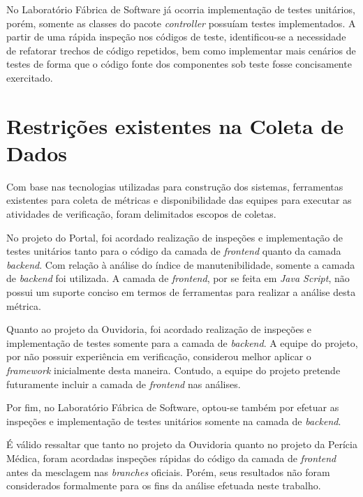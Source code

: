 No Laboratório Fábrica de Software já ocorria implementação de testes unitários, porém, somente as classes do pacote \textit{controller} possuíam testes implementados. A partir de uma rápida inspeção nos códigos de teste, identificou-se a necessidade de refatorar trechos de código repetidos, bem como implementar mais cenários de testes de forma que o código fonte dos componentes sob teste fosse concisamente exercitado.

\section{Restrições existentes na Coleta de Dados}

Com base nas tecnologias utilizadas para construção dos sistemas, ferramentas existentes para coleta de métricas e disponibilidade das equipes para executar as atividades de verificação, foram delimitados escopos de coletas.

No projeto do Portal, foi acordado realização de inspeções e implementação de testes unitários tanto para o código da camada de \textit{frontend} quanto da camada \textit{backend}. Com relação à análise do índice de manutenibilidade, somente a camada de \textit{backend} foi utilizada. A camada de \textit{frontend}, por se feita em \textit{Java Script}, não possui um suporte conciso em termos de ferramentas para realizar a análise desta métrica.

Quanto ao projeto da Ouvidoria, foi acordado realização de inspeções e implementação de testes somente para a camada de \textit{backend}. A equipe do projeto, por não possuir experiência em verificação, considerou melhor aplicar o \textit{framework} inicialmente desta maneira. Contudo, a equipe do projeto pretende futuramente incluir a camada de \textit{frontend} nas análises.

Por fim, no Laboratório Fábrica de Software, optou-se também por efetuar as inspeções e implementação de testes unitários somente na camada de \textit{backend}.

É válido ressaltar que tanto no projeto da Ouvidoria quanto no projeto da Perícia Médica, foram acordadas inspeções rápidas do código da camada de \textit{frontend} antes da mesclagem nas \textit{branches} oficiais. Porém, seus resultados não foram considerados formalmente para os fins da análise efetuada neste trabalho.